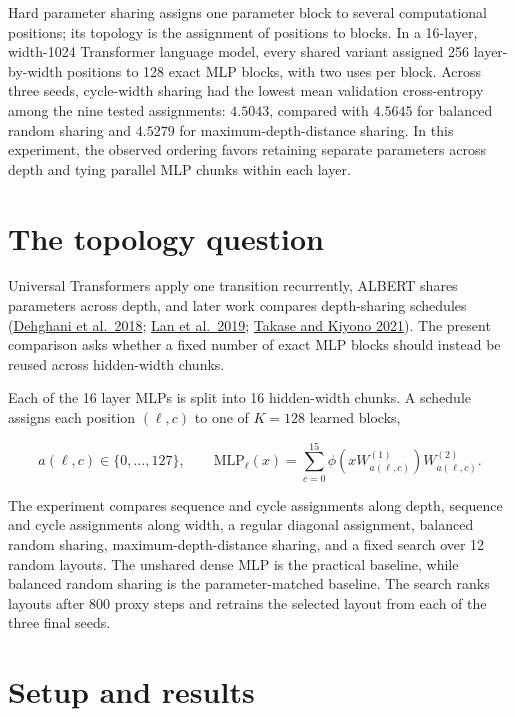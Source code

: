 \documentclass[11pt]{article}
\begin{document}
Hard parameter sharing assigns one parameter block to several computational positions; its topology is the assignment of positions to blocks. In a 16-layer, width-1024 Transformer language model, every shared variant assigned 256 layer-by-width positions to 128 exact MLP blocks, with two uses per block. Across three seeds, cycle-width sharing had the lowest mean validation cross-entropy among the nine tested assignments: \(4.5043\), compared with \(4.5645\) for balanced random sharing and \(4.5279\) for maximum-depth-distance sharing. In this experiment, the observed ordering favors retaining separate parameters across depth and tying parallel MLP chunks within each layer.

\section{The topology question}\label{the-topology-question}

Universal Transformers apply one transition recurrently, ALBERT shares parameters across depth, and later work compares depth-sharing schedules (\href{https://arxiv.org/abs/1807.03819}{Dehghani et al.~2018}; \href{https://arxiv.org/abs/1909.11942}{Lan et al.~2019}; \href{https://arxiv.org/abs/2104.06022}{Takase and Kiyono 2021}). The present comparison asks whether a fixed number of exact MLP blocks should instead be reused across hidden-width chunks.

Each of the 16 layer MLPs is split into 16 hidden-width chunks. A schedule assigns each position \((\ell,c)\) to one of \(K=128\) learned blocks,

\[
a(\ell,c)\in\{0,\ldots,127\},
\qquad
\mathrm{MLP}_{\ell}(x)
=\sum_{c=0}^{15}
\phi\!\left(xW^{(1)}_{a(\ell,c)}\right)
W^{(2)}_{a(\ell,c)}.
\]

The experiment compares sequence and cycle assignments along depth, sequence and cycle assignments along width, a regular diagonal assignment, balanced random sharing, maximum-depth-distance sharing, and a fixed search over 12 random layouts. The unshared dense MLP is the practical baseline, while balanced random sharing is the parameter-matched baseline. The search ranks layouts after 800 proxy steps and retrains the selected layout from each of the three final seeds.

\section{Setup and results}\label{setup-and-results}
\end{document}
